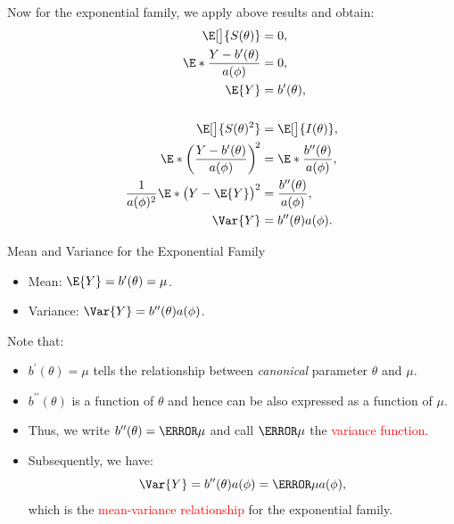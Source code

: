 \documentclass{article}\usepackage[]{graphicx}\usepackage[svgnames]{xcolor}
\begin{document}
Now for the exponential family, we apply above results and obtain:
\begin{align*}
    \E[\big]{S(\theta)}                                          & =0,                                             \\
    \E*{\frac{Y-b^{\prime}(\theta)}{a(\phi)}}                    & =0,                                             \\
    \E{Y}                                                        & =b^\prime(\theta),                              \\\\
    \E[\big]{S(\theta)^2}                                        & =\E[\big]{I(\theta)},                           \\
    \E*{\biggl(\frac{Y-b^\prime(\theta)}{a(\phi)} \biggr)^{\!2}} & =\E*{\frac{b^{\prime\prime}(\theta)}{a(\phi)}}, \\
    \frac{1}{a(\phi)^2}\E*{\bigl(Y-\E{Y}\bigr)^2}                & =\frac{b^{\prime\prime}(\theta)}{a(\phi)},      \\
    \Var{Y}                                                      & =b^{\prime\prime}(\theta)a(\phi).
\end{align*}
\begin{Regular}{Mean and Variance for the Exponential Family}
    \begin{itemize}
        \item Mean: $ \E{Y}=b^\prime(\theta)=\mu $.
        \item Variance: $ \Var{Y}=b^{\prime\prime}(\theta)a(\phi) $.
    \end{itemize}
\end{Regular}
Note that:
\begin{itemize}
    \item $ b^\prime(\theta)=\mu $ tells the relationship between \emph{canonical} parameter $ \theta $ and $ \mu $.
    \item $ b^{\prime\prime}(\theta) $ is a function of $ \theta $ and hence can be also expressed as a function of $ \mu $.
    \item Thus, we write $ b^{\prime\prime}(\theta)=\V{\mu} $ and call $ \V{\mu} $ the \textcolor{Red}{variance function}.
    \item Subsequently, we have:
          \[ \Var{Y}=b^{\prime\prime}(\theta)a(\phi)=\V{\mu}a(\phi), \]
          which is the \textcolor{Red}{mean-variance relationship} for the exponential family.
\end{itemize}
\end{document}
